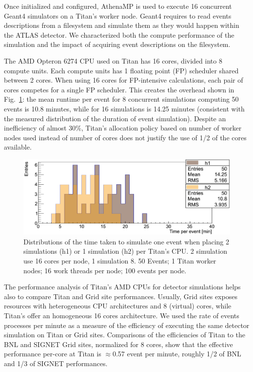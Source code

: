 Once initialized and configured, AthenaMP is used to execute 16 concurrent
Geant4 simulators on a Titan's worker node. Geant4 requires to read events
descriptions from a filesystem and simulate them as they would happen within
the ATLAS detector. We characterized both the compute performance of the
simulation and the impact of acquiring event descriptions on the filesystem.

The AMD Opteron 6274 CPU used on Titan has 16 cores, divided into 8 compute
units. Each compute units has 1 floating point (FP) scheduler shared between
2 cores. When using 16 cores for FP-intensive calculations, each pair of
cores competes for a single FP scheduler. This creates the overhead shown in
Fig.~\ref{fig:comparison-8-16cores}: the mean runtime per event for 8
concurrent simulations computing 50 events is 10.8 minutes, while for 16
simulations is 14.25 minutes (consistent with the measured distribution of
the duration of event simulation). Despite an inefficiency of almost 30\%,
Titan's allocation policy based on number of worker nodes used instead of
number of cores does not justify the use of 1/2 of the cores available.

\begin{figure}[htp]
    \includegraphics[clip,width=\columnwidth]{figures/tx8_tx16_comparison_vsquashed.pdf}
    \vspace{-0.3in}
    \caption{Distributions of the time taken to simulate one event when
    placing 2 simulations (h1) or 1 simulation (h2) per Titan's CPU\@. 2
    simulation use 16 cores per node, 1 simulation 8. 50 Events; 1 Titan
    worker nodes; 16 work threads per node; 100 events per
    node.}\label{fig:comparison-8-16cores}
\end{figure}

The performance analysis of Titan's AMD CPUs for detector simulations helps
also to compare Titan and Grid site performances. Usually, Grid sites exposes
resources with heterogeneous CPU architectures and 8 (virtual) cores, while
Titan's offer an homogeneous 16 cores architecture. We used the rate of
events processes per minute as a measure of the efficiency of executing the
same detector simulation on Titan or Grid sites. Comparisons of the
efficiencies of Titan to the BNL and SIGNET Grid sites, normalized for 8
cores, show that the effective performance per-core at Titan is
\(\approx\)0.57 event per minute, roughly 1/2 of BNL and  1/3 of SIGNET
performances.

